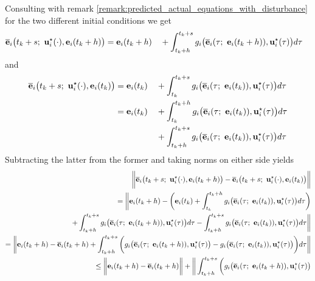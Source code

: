 \begin{gg_box}
Consulting with remark \eqref{remark:predicted_actual_equations_with_disturbance}
for the two different initial conditions we get
\begin{alignat}{2}
  \overline{\bm{\mathbf{e}}}_i\big(t_k + s;\ \bm{\mathbf{u}}_i^{\star}(\cdot), \bm{\mathbf{e}}_i(t_k +h)\big)
    &= \bm{\mathbf{e}}_i(t_k +h)
    &&+ \int_{t_k +h}^{t_k + s} g_i\big(\overline{\bm{\mathbf{e}}}_i(\tau;\ \bm{\mathbf{e}}_i(t_k + h)), \bm{\mathbf{u}}_i^{\star}(\tau)\big) d\tau
\end{alignat}
and
\begin{alignat}{2}
  \overline{\bm{\mathbf{e}}}_i\big(t_k + s;\ \bm{\mathbf{u}}_i^{\star}(\cdot), \bm{\mathbf{e}}_i(t_k)\big)
    &= \bm{\mathbf{e}}_i(t_k)
    &&+ \int_{t_k}^{t_k + s} g_i\big(\overline{\bm{\mathbf{e}}}_i(\tau;\ \bm{\mathbf{e}}_i(t_k)), \bm{\mathbf{u}}_i^{\star}(\tau)\big) d\tau \\
  &= \bm{\mathbf{e}}_i(t_k)
    &&+ \int_{t_k}^{t_k + h} g_i\big(\overline{\bm{\mathbf{e}}}_i(\tau;\ \bm{\mathbf{e}}_i(t_k)), \bm{\mathbf{u}}_i^{\star}(\tau)\big) d\tau \\
  & &&+ \int_{t_k + h}^{t_k + s} g_i\big(\overline{\bm{\mathbf{e}}}_i(\tau;\ \bm{\mathbf{e}}_i(t_k)), \bm{\mathbf{u}}_i^{\star}(\tau)\big) d\tau
\end{alignat}
Subtracting the latter from the former and taking norms on either side yields
\begin{align}
  \bigg \| \overline{\vect{e}}_i\big(t_k + s;\ \vect{u}_i^{\star}(\cdot), \vect{e}_i(t_k +h)\big)
    -\overline{\vect{e}}_i\big(t_k + s;\ \vect{u}_i^{\star}(\cdot), \vect{e}_i(t_k)\big) \bigg \| \\
 = \bigg\| \vect{e}_i(t_k +h)
 - \bigg( \vect{e}_i(t_k) + \int_{t_k}^{t_k + h} g_i\big(\overline{\vect{e}}_i(\tau;\ \vect{e}_i(t_k)), \vect{u}_i^{\star}(\tau)\big) d\tau \bigg) \\
    + \int_{t_k +h}^{t_k + s} g_i\big(\overline{\vect{e}}_i(\tau;\ \vect{e}_i(t_k + h)), \vect{u}_i^{\star}(\tau)\big) d\tau
    - \int_{t_k + h}^{t_k + s} g_i\big(\overline{\vect{e}}_i(\tau;\ \vect{e}_i(t_k)), \vect{u}_i^{\star}(\tau)\big) d\tau \bigg\| \\
    = \bigg\| \vect{e}_i(t_k +h) - \overline{\vect{e}}_i(t_k + h)
    + \int_{t_k +h}^{t_k + s} \bigg( g_i\big(\overline{\vect{e}}_i(\tau;\ \vect{e}_i(t_k + h)), \vect{u}_i^{\star}(\tau)\big)
    -  g_i\big(\overline{\vect{e}}_i(\tau;\ \vect{e}_i(t_k)), \vect{u}_i^{\star}(\tau)\big) \bigg) d\tau \bigg\| \\
    \leq \bigg\| \vect{e}_i(t_k +h) - \overline{\vect{e}}_i(t_k + h) \bigg \|
    + \bigg\| \int_{t_k +h}^{t_k + s} \bigg( g_i\big(\overline{\vect{e}}_i(\tau;\ \vect{e}_i(t_k + h)), \vect{u}_i^{\star}(\tau)\big)

\end{align}
\end{gg_box}
